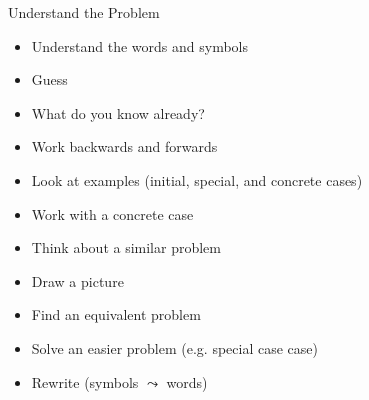 \documentclass[../slides.tex]{subfiles}
\begin{document}
\begin{frame}{Understand the Problem}

		\begin{itemize}
					
						\item Understand the words and symbols
						
						\item Guess
						
						\item What do you know already?
						
						\item Work backwards and forwards
						
						\item Look at examples (initial, special, and concrete cases)
						
						\item Work with a concrete case
						
						\item Think about a similar problem
						
						\item Draw a picture
						
						\item Find an equivalent problem
						
						\item Solve an easier problem (e.g. special case case)
						
						\item Rewrite (symbols  $\leadsto$ words)
					
					\end{itemize}

\end{frame}
\end{document}
